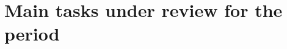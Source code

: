 \documentclass{beamer}
\begin{document}



\section{Main tasks under review for the period}
\end{document}
